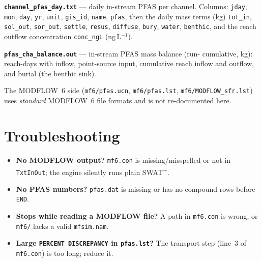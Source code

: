 \documentclass[12pt]{article}
\begin{document}
\textbf{\texttt{channel\_pfas\_day.txt}} --- daily in-stream PFAS per channel.
Columns: \texttt{jday}, \texttt{mon}, \texttt{day}, \texttt{yr}, \texttt{unit},
\texttt{gis\_id}, \texttt{name}, \texttt{pfas}, then the daily mass terms (kg)
\texttt{tot\_in}, \texttt{sol\_out}, \texttt{sor\_out}, \texttt{settle},
\texttt{resus}, \texttt{diffuse}, \texttt{bury}, \texttt{water}, \texttt{benthic},
and the reach outflow concentration \texttt{conc\_ngL} (ng\,L$^{-1}$).

\textbf{\texttt{pfas\_cha\_balance.out}} --- in-stream PFAS mass balance (run-
cumulative, kg): reach-days with inflow, point-source input, cumulative reach
inflow and outflow, and burial (the benthic sink).

The MODFLOW~6 side (\texttt{mf6/pfas.ucn}, \texttt{mf6/pfas.lst},
\texttt{mf6/MODFLOW\_sfr.lst}) uses \emph{standard} MODFLOW~6 file formats and is
not re-documented here.

\section{Troubleshooting}\label{g:trouble}
\begin{itemize}
  \item \textbf{No MODFLOW output?} \texttt{mf6.con} is missing/misspelled or not
        in \texttt{TxtInOut}; the engine silently runs plain SWAT\textsuperscript{+}.
  \item \textbf{No PFAS numbers?} \texttt{pfas.dat} is missing or has no compound
        rows before \texttt{END}.
  \item \textbf{Stops while reading a MODFLOW file?} A path in \texttt{mf6.con} is
        wrong, or \texttt{mf6/} lacks a valid \texttt{mfsim.nam}.
  \item \textbf{Large \texttt{PERCENT DISCREPANCY} in \texttt{pfas.lst}?} The
        transport step (line~3 of \texttt{mf6.con}) is too long; reduce it.
\end{itemize}
\end{document}
